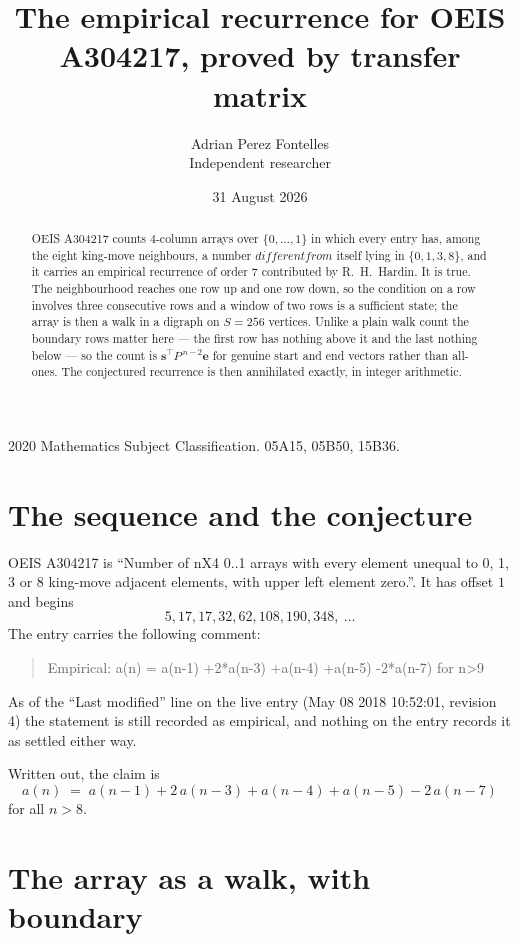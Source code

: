 \documentclass[11pt,a4paper]{article}
\title{The empirical recurrence for OEIS A304217, proved by transfer matrix}
\author{Adrian Perez Fontelles\\ \small Independent researcher}
\date{31 August 2026}
\theoremstyle{plain}
\theoremstyle{definition}
\begin{document}
\maketitle

\begin{abstract}
OEIS A304217 counts $4$-column arrays over $\{0,\dots,1\}$ in which every entry has,
among the eight king-move neighbours, a number $different from$ itself lying in $\{0,1,3,8\}$, and it carries an empirical
recurrence of order $7$ contributed by R.~H.~Hardin. It is true. The neighbourhood
reaches one row up and one row down, so the condition on a row involves three consecutive
rows and a window of two rows is a sufficient state; the array is then a walk in a digraph
on $S=256$ vertices. Unlike a plain walk count the boundary rows matter here --- the first
row has nothing above it and the last nothing below --- so the count is
$\mathbf{s}^{\!\top}P^{\,n-2}\mathbf{e}$ for genuine start and end vectors rather than
all-ones. The conjectured recurrence is then annihilated exactly, in integer arithmetic.
\end{abstract}

\noindent\small 2020 Mathematics Subject Classification. 05A15, 05B50, 15B36.\normalsize

\section{The sequence and the conjecture}

OEIS A304217 is ``Number of nX4 0..1 arrays with every element unequal to 0, 1, 3 or 8 king-move adjacent elements, with upper left element zero.''. It has offset
$1$ and begins
\[
5, 17, 17, 32, 62, 108, 190, 348,\ \dots
\]
The entry carries the following comment:
\begin{quote}\small
Empirical: a(n) = a(n-1) +2*a(n-3) +a(n-4) +a(n-5) -2*a(n-7) for n>9
\end{quote}
As of the ``Last modified'' line on the live entry (May 08 2018 10:52:01, revision
4) the statement is still recorded as empirical, and nothing on the entry
records it as settled either way.

Written out, the claim is
\begin{equation}\label{eq:conj}
a(n)\;=\;a(n-1) + 2\,a(n-3) + a(n-4) + a(n-5) - 2\,a(n-7)
\end{equation}
for all $n>8$.

\section{The array as a walk, with boundary}
\end{document}
